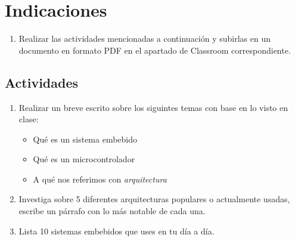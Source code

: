 \documentclass[11pt,letterpaper]{article}
\begin{document}

\section*{Indicaciones}
\begin{enumerate}[label=(\roman*)]
    \item Realizar las actividades mencionadas a continuación y subirlas en un documento en formato PDF en el apartado de Classroom correspondiente. 
\end{enumerate}
\subsection*{Actividades}
\begin{enumerate}[label=\arabic*)]
    \item Realizar un breve escrito sobre los siguintes temas con base en lo visto en clase:
    \begin{itemize}
        \item Qué es un sistema embebido
        \item Qué es un microcontrolador
        \item A qué nos referimos con \textit{arquitectura}
    \end{itemize}
    \item Investiga sobre 5 diferentes arquitecturas populares o actualmente usadas, escribe un párrafo con lo más notable de cada una.
    \item Lista 10 sistemas embebidos que uses en tu día a día.
\end{enumerate}

\end{document}
